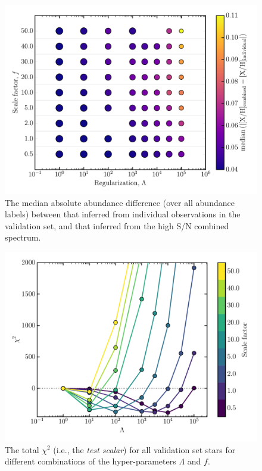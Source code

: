 \documentclass[12pt,preprint]{aastex}
\begin{document}
\begin{figure}[p]
\centering
\includegraphics[width=\textwidth]{gs-mad-all-elements.pdf}
\caption{The median absolute abundance difference (over all abundance labels)
between that inferred from individual observations in the validation set, and
that inferred from the high S/N combined spectrum.
\label{fig:gridsearch-mad-all-elements}}
\end{figure}



\begin{figure}[p]
\centering
\includegraphics[width=\textwidth]{validation-scalar.pdf}
\caption{The total $\chi^2$ (i.e., the \emph{test scalar}) for all validation set stars for different combinations of the hyper-parameters $\Lambda$ and $f$.
 \label{fig:gridsearch-test-scalar}}
\end{figure}
\end{document}
